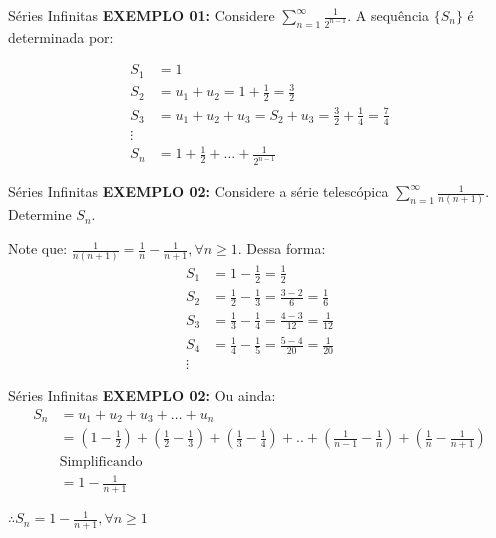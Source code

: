 \documentclass[hyperref={pdfpagelabels=false}]{beamer}
\begin{document}
\begin{frame}{Séries Infinitas}
 {\bf EXEMPLO 01:} Considere $\displaystyle \sum_{n=1}^{\infty} \frac{1}{2^{n-1}}$. A sequência $\{S_n\}$ é determinada por: \pause
 
 \begin{align*}
  S_1 &= 1 \\
  S_2 &= u_1 + u_2 = 1 + \frac{1}{2} = \frac{3}{2} \\
  S_3 &= u_1 + u_2 + u_3 = S_2 + u_3 = \frac{3}{2} + \frac{1}{4} = \frac{7}{4} \\
  \vdots \\
  S_n &= 1 + \frac{1}{2} + \dots + \frac{1}{2^{n-1}}
 \end{align*}

\end{frame}

\begin{frame}{Séries Infinitas}
 {\bf EXEMPLO 02:} Considere a série telescópica $\displaystyle \sum_{n=1}^{\infty} \frac{1}{n(n+1)}$. Determine $S_n$. \pause
 
 Note que: $\displaystyle \frac{1}{n(n+1)} = \displaystyle \frac{1}{n} - \displaystyle \frac{1}{n+1}, \forall n \geq 1$. Dessa forma: \pause
 \begin{align*}
  S_1 &= 1 - \frac{1}{2} = \frac{1}{2}\\
  S_2 &= \frac{1}{2} - \frac{1}{3} = \frac{3-2}{6} = \frac{1}{6}\\
  S_3 &= \frac{1}{3} - \frac{1}{4} = \frac{4-3}{12} = \frac{1}{12}\\
  S_4 &= \frac{1}{4} - \frac{1}{5} = \frac{5-4}{20} = \frac{1}{20}\\
  \vdots   
 \end{align*}

\end{frame}

\begin{frame}{Séries Infinitas}
 {\bf EXEMPLO 02:}
 Ou ainda: \pause
 \begin{align*}
  S_n &= u_1 + u_2 + u_3 + \dots + u_n \\
  &= \left(1 - \frac{1}{2} \right) + \left(\frac{1}{2} - \frac{1}{3} \right) + \left(\frac{1}{3} - \frac{1}{4} \right) + .. + \left(\frac{1}{n-1} - \frac{1}{n} \right) + \left(\frac{1}{n} - \frac{1}{n+1} \right) \\
  &\text{Simplificando} \\
  &= 1 - \frac{1}{n+1}
 \end{align*} \pause

 $\therefore S_n = 1 - \displaystyle \frac{1}{n+1}, \forall n \geq 1$
\end{frame}
\end{document}
